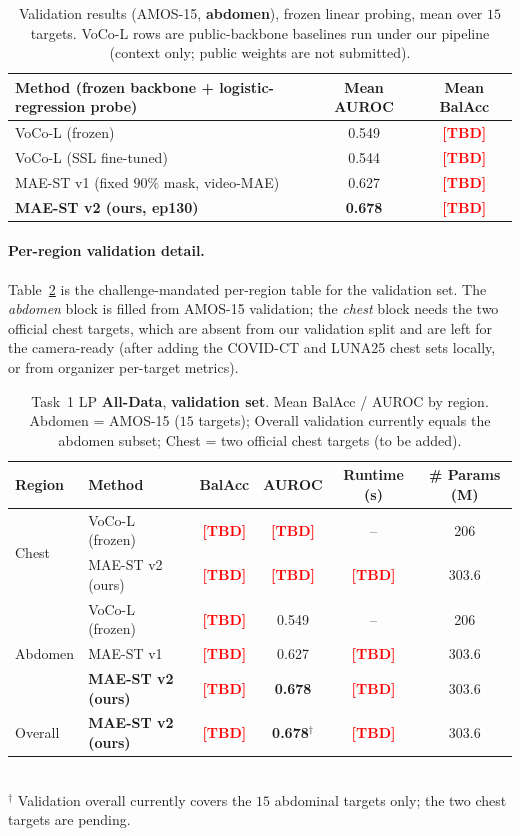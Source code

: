 \documentclass[runningheads]{llncs}
\newcommand{\tba}{\textcolor{red}{\textbf{[TBD]}}}
\begin{document}
\begin{table}[htbp]
\caption{Validation results (AMOS-15, \textbf{abdomen}), frozen linear probing,
mean over $15$ targets. VoCo-L rows are public-backbone baselines run under our
pipeline (context only; public weights are not submitted).}
\label{tab:lineage}
\centering
\begin{tabular}{lcc}
\hline
Method (frozen backbone + logistic-regression probe) & Mean AUROC & Mean BalAcc \\ \hline
VoCo-L (frozen)                       & 0.549 & \tba{} \\
VoCo-L (SSL fine-tuned)               & 0.544 & \tba{} \\
MAE-ST v1 (fixed $90\%$ mask, video-MAE) & 0.627 & \tba{} \\
\textbf{MAE-ST v2 (ours, ep130)}      & \textbf{0.678} & \tba{} \\ \hline
\end{tabular}
\end{table}

\paragraph{Per-region validation detail.}
Table~\ref{tab:results-lp} is the challenge-mandated per-region table for the
validation set. The \emph{abdomen} block is filled from AMOS-15 validation; the
\emph{chest} block needs the two official chest targets, which are absent from
our validation split and are left for the camera-ready (after adding the COVID-CT
and LUNA25 chest sets locally, or from organizer per-target metrics).

\begin{table}[htbp]
\caption{Task~1 LP \textbf{All-Data}, \textbf{validation set}. Mean BalAcc /
AUROC by region. Abdomen = AMOS-15 ($15$ targets); Overall validation currently
equals the abdomen subset; Chest = two official chest targets (to be added).}
\label{tab:results-lp}
\centering
\begin{tabular}{llcccc}
\hline
Region & Method & BalAcc & AUROC & Runtime (s) & \# Params (M) \\ \hline
\multirow{2}{*}{Chest}
        & VoCo-L (frozen)    & \tba{} & \tba{} & --     & 206 \\
        & MAE-ST v2 (ours)   & \tba{} & \tba{} & \tba{} & 303.6 \\ \hline
\multirow{3}{*}{Abdomen}
        & VoCo-L (frozen)    & \tba{} & 0.549 & --     & 206 \\
        & MAE-ST v1          & \tba{} & 0.627 & \tba{} & 303.6 \\
        & \textbf{MAE-ST v2 (ours)}   & \tba{} & \textbf{0.678} & \tba{} & 303.6 \\ \hline
\multirow{1}{*}{Overall}
        & \textbf{MAE-ST v2 (ours)} & \tba{} & \textbf{0.678}$^\dagger$ & \tba{} & 303.6 \\ \hline
\end{tabular}
\\[2pt]
{\footnotesize $^\dagger$ Validation overall currently covers the $15$ abdominal
targets only; the two chest targets are pending.}
\end{table}
\end{document}
